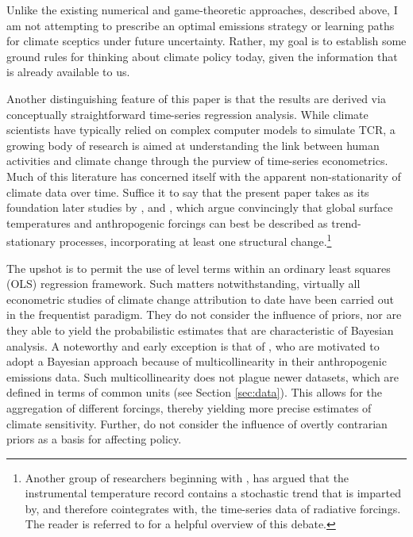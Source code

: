\documentclass[smallextended]{svjour3}       %
\begin{document}
Unlike the existing numerical and game-theoretic approaches, described
above, I am not attempting to prescribe an optimal emissions strategy or
learning paths for climate sceptics under future uncertainty. Rather, my
goal is to establish some ground rules for thinking about climate policy
today, given the information that is already available to us.

Another distinguishing feature of this paper is that the results are
derived via conceptually straightforward time-series regression
analysis. While climate scientists have typically relied on complex
computer models to simulate TCR, a growing body of research is aimed at
understanding the link between human activities and climate change
through the purview of time-series econometrics. Much of this literature
has concerned itself with the apparent non-stationarity of climate data
over time. Suffice it to say that the present paper takes as its
foundation later studies by \cite{gay2009global},
\cite{estrada2013statistically} and \cite{estrada2013time}, which argue
convincingly that global surface temperatures and anthropogenic forcings
can best be described as trend-stationary processes, incorporating at
least one structural change.\footnote{Another group of researchers
  beginning with \cite{stern2000detecting}, has argued that the
  instrumental temperature record contains a stochastic trend that is
  imparted by, and therefore cointegrates with, the time-series data of
  radiative forcings. The reader is referred to
  \cite{estrada2013detection} for a helpful overview of this debate.}

The upshot is to permit the use of level terms within an ordinary least
squares (OLS) regression framework. Such matters notwithstanding,
virtually all econometric studies of climate change attribution to date
have been carried out in the frequentist paradigm. They do not consider
the influence of priors, nor are they able to yield the probabilistic
estimates that are characteristic of Bayesian analysis. A noteworthy and
early exception is that of \cite{tol1998bayes}, who are motivated to
adopt a Bayesian approach because of multicollinearity in their
anthropogenic emissions data. Such multicollinearity does not plague
newer datasets, which are defined in terms of common units (see Section
\ref{sec:data}). This allows for the aggregation of different forcings,
thereby yielding more precise estimates of climate sensitivity. Further,
\cite{tol1998bayes} do not consider the influence of overtly contrarian
priors as a basis for affecting policy.
\end{document}
